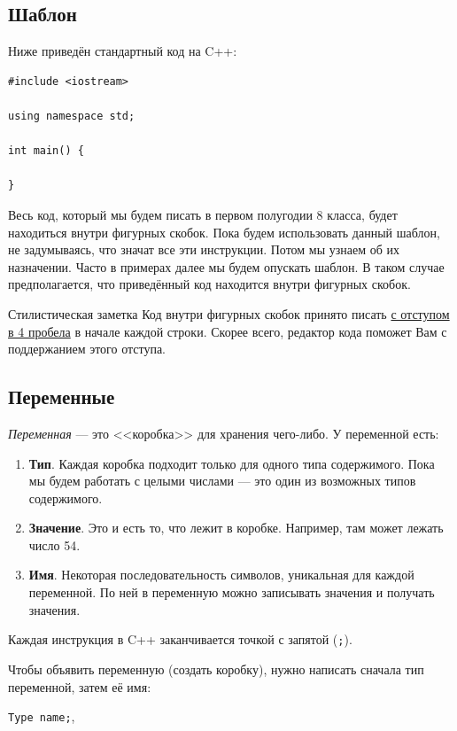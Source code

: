 \documentclass{article}
\newcommand{\style}[1]{
	\begin{sectionenv}[green!30!white]{Стилистическая заметка}
		#1
	\end{sectionenv}
}
\begin{document}
	\subsection{Шаблон}
	
	Ниже приведён стандартный код на C++:
	
	\begin{lstlisting}
#include <iostream>

using namespace std;

int main() {
	
}
	\end{lstlisting}
	
	Весь код, который мы будем писать в первом полугодии 8 класса, будет находиться внутри фигурных скобок. Пока будем использовать данный шаблон, не задумываясь, что значат все эти инструкции. Потом мы узнаем об их назначении. Часто в примерах далее мы будем опускать шаблон. В таком случае предполагается, что приведённый код находится внутри фигурных скобок.
	
	\style{Код внутри фигурных скобок принято писать \underline{с отступом в 4 пробела} в начале каждой строки. Скорее всего, редактор кода поможет Вам с поддержанием этого отступа.}
	
	\subsection{Переменные}
	\label{sec:variables}
	
	\textit{Переменная} --- это <<коробка>> для хранения чего-либо. У переменной есть:
	\begin{enumerate}
		\item{\textbf{Тип}. Каждая коробка подходит только для одного типа содержимого. Пока мы будем работать с целыми числами --- это один из возможных типов содержимого.}
		\item{\textbf{Значение}. Это и есть то, что лежит в коробке. Например, там может лежать число 54.}
		\item{\textbf{Имя}}. Некоторая последовательность символов, уникальная для каждой переменной. По ней в переменную можно записывать значения и получать значения.
	\end{enumerate}
	
	Каждая инструкция в C++ заканчивается точкой с запятой (\texttt{;}).
	
	Чтобы объявить переменную (создать коробку), нужно написать сначала тип переменной, затем её имя:
	
	\begin{center}
		\texttt{Type name;},
	\end{center}
	
\end{document}
